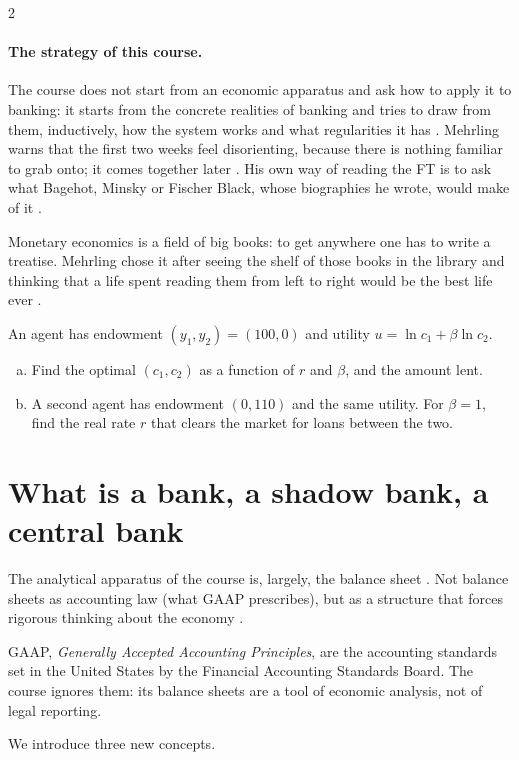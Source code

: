 \begin{paracol}{2}
\paragraph{The strategy of this course.} The course does not start from an economic apparatus and ask how to
apply it to banking: it starts from the concrete realities of banking and tries to draw from them, inductively,
how the system works and what regularities it has . Mehrling warns that the first two weeks
feel disorienting, because there is nothing familiar to grab onto; it comes together later . His own
way of reading the FT is to ask what Bagehot, Minsky or Fischer Black, whose biographies he wrote, would make of
it .\begin{aside}
Monetary economics is a field of big books: to get anywhere one has to write a treatise. Mehrling chose it after
seeing the shelf of those books in the library and thinking that a life spent reading them from left to right
would be the best life ever .
\end{aside}

\begin{exercise}
An agent has endowment $(y_1,y_2)=(100,0)$ and utility $u=\ln c_1+\beta\ln c_2$.
\begin{enumerate}[(a)]
  \item Find the optimal $(c_1,c_2)$ as a function of $r$ and $\beta$, and the amount lent.
  \item A second agent has endowment $(0,110)$ and the same utility. For $\beta=1$, find the real rate $r$ that clears
        the market for loans between the two.
\end{enumerate}
\end{exercise}

\section{What is a bank, a shadow bank, a central bank}\label{sec:fp-banks}

The analytical apparatus of the course is, largely, the balance sheet . Not balance sheets as
accounting law (what GAAP prescribes), but as a structure that forces rigorous thinking about the economy
.\begin{aside}[GAAP]
GAAP, \emph{Generally Accepted Accounting Principles}, are the accounting standards set in the United
States by the Financial Accounting Standards Board. The course ignores them: its balance sheets are a tool of
economic analysis, not of legal reporting.
\end{aside} We introduce three new concepts.


\end{paracol}
